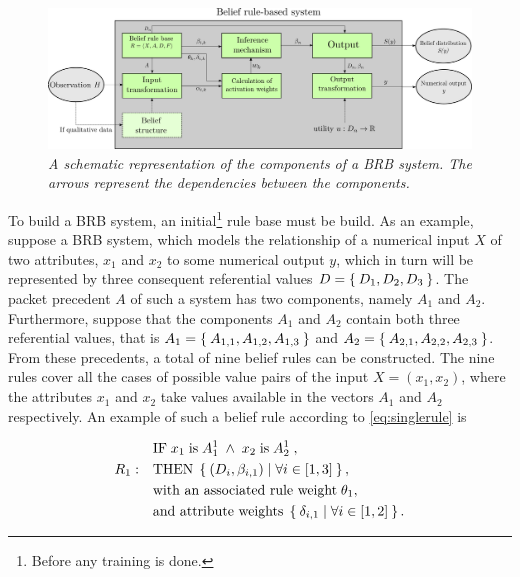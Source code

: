 \begin{figure}[htp]
    \centering
    \includegraphics[width=15cm]{contents/brb_structure.png}
    \caption{\emph{A schematic representation of the components of a BRB system. The arrows represent the
    dependencies between the components.}}
    \label{fig:brbschematic}
\end{figure}

To build a BRB system, an initial\footnote{Before any training is done.} rule base must be build.
As an example, suppose a BRB system, which models the relationship of a numerical input $X$ of two attributes, $x_1$ and $x_2$ to some numerical 
output $y$, which
in turn will be represented by three consequent referential values $D = \Set{D_1, D_2, D_3}$.
The packet precedent $A$ of
such a system has two components, namely $A_1$ and $A_2$. Furthermore, suppose that the components $A_1$ and $A_2$ contain both three
referential values, that is $A_1 = \Set{A_{1,1}, A_{1,2}, A_{1,3}}$ and $A_2 = \Set{A_{2,1}, A_{2,2}, A_{2,3}}$. From these precedents, a total
of nine belief rules can be constructed. The nine rules cover all the cases of possible value pairs of the input $X = (x_1, x_2)$, where
the attributes $x_1$ and $x_2$ take values available in the vectors $A_1$ and $A_2$ respectively. An example of such a belief rule
according to \eqref{eq:singlerule} is

\begin{align}
\begin{split}
    \label{eq:examplerule}
    & \text{IF}\; x_1\; \text{is}\; A_1^1\; \land\; x_2\; \text{is}\; A_2^1\;, \\
    R_1:\quad & \text{THEN}\; \Set{\left( D_i, \beta_{i, 1} \right) \mid \forall i \in \left[1, 3 \right]}, \\
    & \text{with an associated rule weight}\; \theta_1, \\
    & \text{and attribute weights}\; \Set{\delta_{i, 1} \mid \forall i \in \left[ 1, 2 \right]}.
\end{split}
\end{align}

